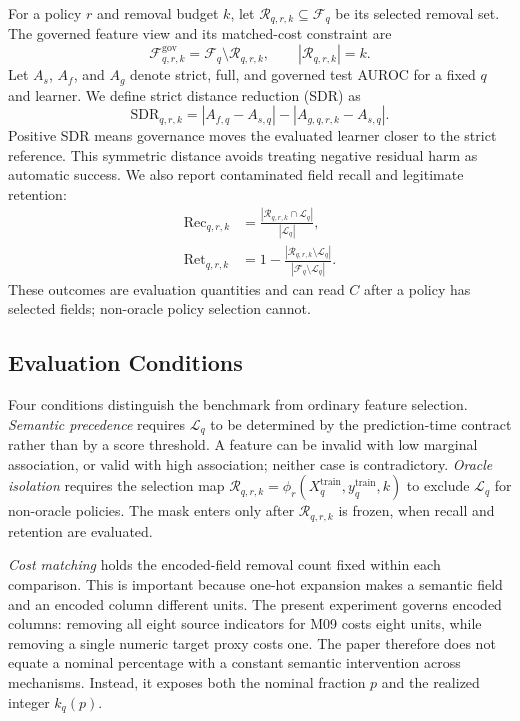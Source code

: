 \documentclass[sigconf,review]{acmart}
\begin{document}
For a policy $r$ and removal budget $k$, let
$\mathcal{R}_{q,r,k}\subseteq\mathcal{F}_q$ be its selected removal set. The
governed feature view and its matched-cost constraint are
\begin{equation}
 \mathcal{F}^{\mathrm{gov}}_{q,r,k}
 =\mathcal{F}_q\setminus\mathcal{R}_{q,r,k},
 \qquad |\mathcal{R}_{q,r,k}|=k.
 \label{eq:governed-view}
\end{equation}
Let $A_s$, $A_f$, and $A_g$ denote strict, full, and governed test AUROC for a
fixed $q$ and learner. We define strict distance reduction (SDR) as
\begin{equation}
 \mathrm{SDR}_{q,r,k}
 = |A_{f,q}-A_{s,q}|-|A_{g,q,r,k}-A_{s,q}|.
 \label{eq:sdr}
\end{equation}
Positive SDR means governance moves the evaluated learner closer to the strict
reference. This symmetric distance avoids treating negative residual harm as
automatic success. We also report contaminated field recall and legitimate
retention:
\begin{align}
 \mathrm{Rec}_{q,r,k}
 &=\frac{|\mathcal{R}_{q,r,k}\cap\mathcal{L}_q|}{|\mathcal{L}_q|},
 \label{eq:recall}\\
 \mathrm{Ret}_{q,r,k}
 &=1-\frac{|\mathcal{R}_{q,r,k}\setminus\mathcal{L}_q|}
 {|\mathcal{F}_q\setminus\mathcal{L}_q|}.
 \label{eq:retention}
\end{align}
These outcomes are evaluation quantities and can read $C$ after a policy has
selected fields; non-oracle policy selection cannot.

\subsection{Evaluation Conditions}

Four conditions distinguish the benchmark from ordinary feature selection.
\textit{Semantic precedence} requires $\mathcal{L}_q$ to be determined by the
prediction-time contract rather than by a score threshold. A feature can be
invalid with low marginal association, or valid with high association; neither
case is contradictory. \textit{Oracle isolation} requires the selection map
$\mathcal{R}_{q,r,k}=\phi_r(X_q^{\mathrm{train}},y_q^{\mathrm{train}},k)$
to exclude $\mathcal{L}_q$ for non-oracle policies. The mask enters only after
$\mathcal{R}_{q,r,k}$ is frozen, when recall and retention are evaluated.

\textit{Cost matching} holds the encoded-field removal count fixed within each
comparison. This is important because one-hot expansion makes a semantic field
and an encoded column different units. The present experiment governs encoded
columns: removing all eight source indicators for M09 costs eight units, while
removing a single numeric target proxy costs one. The paper therefore does not
equate a nominal percentage with a constant semantic intervention across
mechanisms. Instead, it exposes both the nominal fraction $p$ and the realized
integer $k_q(p)$.
\end{document}
